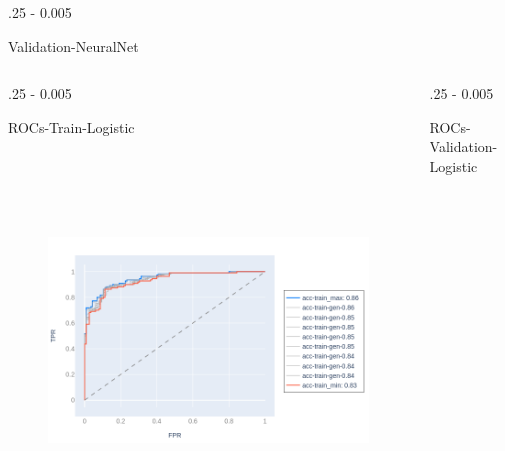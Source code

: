 \documentclass{postertheme}\usepackage[]{graphicx}\usepackage[]{color}
\begin{document}
\begin{frame}
\begin{columns}[onlytextwidth]
\begin{column}{.25 \textwidth - 0.005 \textwidth}
\begin{block}{Validation-NeuralNet}
    \end{block}
  \end{column}
  
\end{columns}


\begin{columns}[onlytextwidth]
  
  \begin{column}{.25 \textwidth - 0.005 \textwidth}
    \begin{block}{ROCs-Train-Logistic}
        
      \begin{figure}
        \includegraphics[width=18cm, height=10cm, keepaspectratio=true]{figures/plot-rocs-logistic-train.png}
      \end{figure}
        
    \end{block}
  \end{column}
  
  \begin{column}{.25 \textwidth - 0.005 \textwidth}
    \begin{block}{ROCs-Validation-Logistic}
        

\end{block}
\end{column}
\end{columns}
\end{frame}
\end{document}
